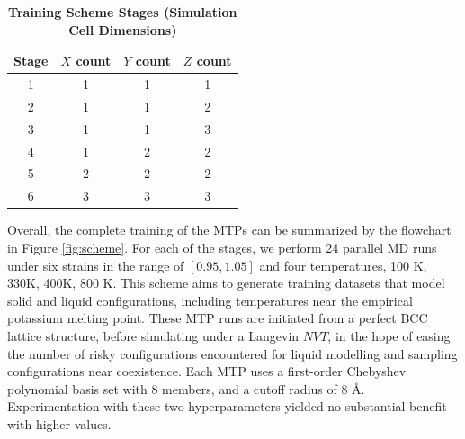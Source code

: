 \documentclass[9pt,twocolumn,twoside]{opticajnl}
\begin{document}
\begin{table}[htbp]
  \centering
  \caption{\bf Training Scheme Stages (Simulation Cell Dimensions)}
  \begin{tabular}{cccc}
  \hline
  Stage & $X$ count & $Y$ count & $Z$ count\\
  \hline
  1 & 1 & 1 & 1\\
  2 & 1 & 1 & 2\\
  3 & 1 & 1 & 3\\
  4 & 1 & 2 & 2\\
  5 & 2 & 2 & 2\\
  6 & 3 & 3 & 3\\
  \hline
  \end{tabular}
  \label{tab:stages}
\end{table}

Overall, the complete training of the MTPs can be summarized by the flowchart in Figure \ref{fig:scheme}. For each of the stages, we perform 24 parallel MD runs under six strains in the range of $[0.95, 1.05]$ and four temperatures, 100 K, 330K, 400K, 800 K. This scheme aims to generate training datasets that model solid and liquid configurations, including temperatures near the empirical potassium melting point. These MTP runs are initiated from a perfect BCC lattice structure, before simulating under a Langevin $NVT$, in the hope of easing the number of risky configurations encountered for liquid modelling and sampling configurations near coexistence. Each MTP uses a first-order Chebyshev polynomial basis set with 8 members, and a cutoff radius of 8 Å. Experimentation with these two hyperparameters yielded no substantial benefit with higher values.  
\end{document}
